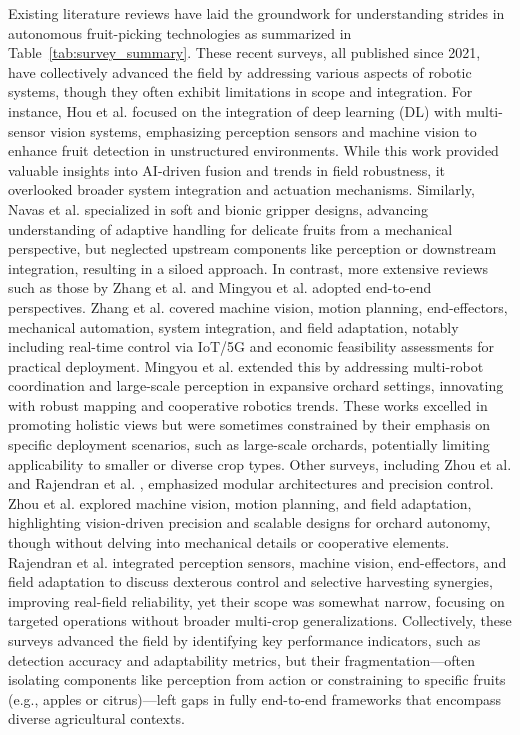 \documentclass{ieeeaccess}
\begin{document}
Existing literature reviews have laid the groundwork for understanding strides in autonomous fruit-picking technologies as summarized in Table~\ref{tab:survey_summary}. These recent surveys, all published since 2021, have collectively advanced the field by addressing various aspects of robotic systems, though they often exhibit limitations in scope and integration.
For instance, Hou et al. \cite{hou2023overview} focused on the integration of deep learning (DL) with multi-sensor vision systems, emphasizing perception sensors and machine vision to enhance fruit detection in unstructured environments. While this work provided valuable insights into AI-driven fusion and trends in field robustness, it overlooked broader system integration and actuation mechanisms. Similarly, Navas et al. \cite{lehnert2017autonomous} specialized in soft and bionic gripper designs, advancing understanding of adaptive handling for delicate fruits from a mechanical perspective, but neglected upstream components like perception or downstream integration, resulting in a siloed approach.
In contrast, more extensive reviews such as those by Zhang et al. \cite{zhang2024automatic} and Mingyou et al. \cite{mingyou2024orchard} adopted end-to-end perspectives. Zhang et al. covered machine vision, motion planning, end-effectors, mechanical automation, system integration, and field adaptation, notably including real-time control via IoT/5G and economic feasibility assessments for practical deployment. Mingyou et al. extended this by addressing multi-robot coordination and large-scale perception in expansive orchard settings, innovating with robust mapping and cooperative robotics trends. These works excelled in promoting holistic views but were sometimes constrained by their emphasis on specific deployment scenarios, such as large-scale orchards, potentially limiting applicability to smaller or diverse crop types.
Other surveys, including Zhou et al. \cite{xiong2020autonomous} and Rajendran et al. \cite{rajendran2024towards}, emphasized modular architectures and precision control. Zhou et al. explored machine vision, motion planning, and field adaptation, highlighting vision-driven precision and scalable designs for orchard autonomy, though without delving into mechanical details or cooperative elements. Rajendran et al. integrated perception sensors, machine vision, end-effectors, and field adaptation to discuss dexterous control and selective harvesting synergies, improving real-field reliability, yet their scope was somewhat narrow, focusing on targeted operations without broader multi-crop generalizations. Collectively, these surveys advanced the field by identifying key performance indicators, such as detection accuracy and adaptability metrics, but their fragmentation—often isolating components like perception from action or constraining to specific fruits (e.g., apples or citrus)—left gaps in fully end-to-end frameworks that encompass diverse agricultural contexts.
\end{document}
